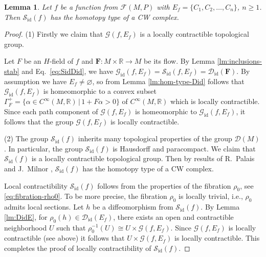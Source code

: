 \documentclass[10pt,reqno]{amsart}
\newtheorem{lemma}[subsection]{Lemma}
\newcommand{\bbR}{\mathbb{R}}
\newcommand{\bfF}{\mathbf{F}}
\newcommand{\Sid}{\mathcal{S}_{\id}(f)}
\newcommand{\F}{\mathcal{F}(M,P)}
\newcommand{\id}{\mathrm{id}}
\begin{document}
\begin{lemma}\label{lm:CW}
	Let $f$ be a function from $\F$ with $E_f = \{C_1, C_2, \ldots, C_n\}$, $n\geq 1$. Then 
	$\Sid$ has the homotopy type of a CW complex.
\end{lemma}
\begin{proof}
{(1) Firstly we claim that $\mathcal{G}(f,E_f)$ is a locally contractible topological group.

Let $F$ be an $H$-field of $f$ and $\bfF:M\times \bbR\to M$ be its flow. By Lemma \ref{lm:inclusions-stab} and Eq.~\eqref{eq:SidDid}, we have
$
\mathcal{G}_{\id}(f,E_f) = \mathcal{S}_{\id}(f,E_f) = \mathcal{D}_{\id}(\bfF).
$
By assumption we have $E_f\neq \varnothing$, so  from  Lemma \ref{lm:hom-type-Did} follows that  $\mathcal{G}_{\id}(f,E_f)$ is homeomorphic to a convex subset $\Gamma_F^+ = \{ \alpha\in C^{\infty}(M,\bbR)\,|\, 1+F\alpha>0 \}$ of $C^{\infty}(M,\bbR)$ which is  locally contractible. Since each path  component of $\mathcal{G}(f,E_f)$ is homeomorphic to $\mathcal{G}_{\id}(f,E_f)$, it follows that
 the group $\mathcal{G}(f,E_f)$ is  locally contractible.

	
(2) The group $\mathcal{S}_{\id}(f)$ inherits many topological properties of the group $\mathcal{D}(M)$. In particular, the group $\mathcal{S}_{\id}(f)$ is Hausdorff and paracompact. 
We claim that $\mathcal{S}_{\id}(f)$ is a locally contractible topological group.
Then by results of R.~Palais \cite{Palais:MemAMS:1960} and J.~Milnor \cite{Milnor:Trans:1959}, $\mathcal{S}_{\id}(f)$ has the homotopy type of a CW complex. 


Local contractibility $\Sid$  follows from the properties of the fibration $\rho_0$, see \eqref{eq:fibration-rho0}. 
To be more precise, the fibration $\rho_0$ is locally trivial, i.e., $\rho_0$ admits local sections.
Let $h$ be a diffeomorphism from $\Sid$.
By Lemma \ref{lm:DidE},
for $\rho_0(h)\in \mathcal{D}_{\id}(E_f)$, there  exists an open and  contractible neighborhood $U$ such that $\rho_0^{-1}(U)\cong U\times \mathcal{G}(f, E_f)$.  Since $\mathcal{G}(f,E_f)$ is locally contractible (see above) it follows that  $ U\times \mathcal{G}(f, E_f)$ is locally contractible. This completes the proof of locally contractibility of  $\Sid$.}
\end{proof}
\end{document}
